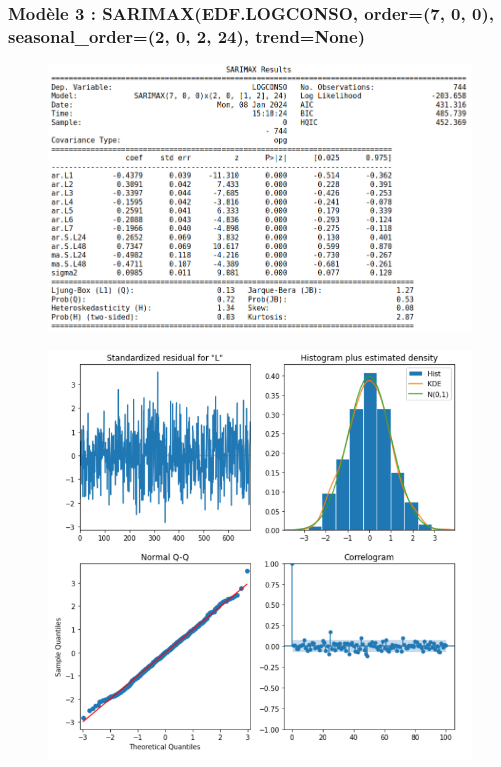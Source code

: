 \documentclass{beamer}
\theoremstyle{definition}
\begin{document}
\begin{frame}
	\frametitle{Modèle 3 : SARIMAX(EDF.LOGCONSO, order=(7, 0, 0), seasonal\_order=(2, 0, 2, 24), trend=None)}
	\begin{minipage}[t]{1\linewidth}
		\centering
		\begin{minipage}[c]{0.55\linewidth}\centering\begin{figure}
				\centering
				\includegraphics[width=1\linewidth]{20.png}	
		\end{figure}\end{minipage}\hfill 
		\begin{minipage}[c]{0.44\linewidth}\centering\begin{figure}
				\begin{center}
					\includegraphics[width=1\linewidth]{21.png}			
				\end{center}
				
		\end{figure}\end{minipage}
	\end{minipage}	
\end{frame}
\end{document}

